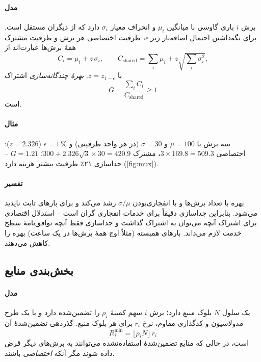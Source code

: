 \documentclass[11pt,a4paper]{article}
\begin{document}
\paragraph{مدل} برش $i$ باری گاوسی با میانگین $\mu_i$ و انحراف معیار $\sigma_i$ دارد که از دیگران مستقل است. برای نگه‌داشتن احتمال
اضافه‌بار زیر $\epsilon$، ظرفیت اختصاصی هر برش و ظرفیت مشترک همهٔ برش‌ها عبارت‌اند از
\begin{equation}\label{eq:dedicated}
  C_i = \mu_i + z\,\sigma_i, \qquad
  C_{\mathrm{shared}} = \sum_i \mu_i + z\sqrt{\sum_i \sigma_i^2},
\end{equation}
با $z = z_{1-\epsilon}$. \emph{بهرهٔ چندگانه‌سازی} اشتراک
\begin{equation}\label{eq:gain}
  G = \frac{\sum_i C_i}{C_{\mathrm{shared}}} \ge 1
\end{equation}
است.
\paragraph{مثال} سه برش با $\mu = 100$ و $\sigma = 30$ (در هر واحد ظرفیتی) و $\epsilon = 1\,\%$ ($z = 2.326$): اختصاصی $3\times169.8 = 509.3$،
مشترک $300 + 2.326\sqrt3\times30 = 420.9$؛ $G = 1.21$ -- جداسازی ۲۱٪ ظرفیت بیشتر هزینه دارد (\cref{fig:mux}).
\paragraph{تفسیر} بهره با تعداد برش‌ها و با انفجاری‌بودن $\sigma/\mu$ رشد می‌کند و برای بارهای ثابت ناپدید می‌شود. بنابراین جداسازی
دقیقاً برای خدمات انفجاری گران است -- استدلال اقتصادی برای اشتراک آنچه می‌توان به اشتراک گذاشت و جداسازی فقط آنچه توافق‌نامهٔ سطح
خدمت لازم می‌داند. بارهای همبسته (مثلاً اوج همهٔ برش‌ها در یک ساعت) بهره را کاهش می‌دهند.

\begin{acnfigure}
  \caption{بهرهٔ چندگانه‌سازی یک مخزن مشترک در برابر ظرفیت اختصاصی برش‌ها (\cref{eq:gain}، $\epsilon = 1\,\%$).}
  \label{fig:mux}
\end{acnfigure}

\subsection{بخش‌بندی منابع }\label{sec:prb}
\paragraph{مدل} یک سلول $N$ بلوک منبع دارد؛ برش $i$ سهم کمینهٔ $\rho_i$ را تضمین‌شده دارد و با یک طرح مدولاسیون و کدگذاری مقاوم، نرخ
$r_i$ برای هر بلوک منبع. گذردهی تضمین‌شدهٔ آن
\begin{equation}\label{eq:prb}
  R_i^{\min} = \lfloor\rho_i N\rfloor\, r_i
\end{equation}
است، در حالی که منابع تضمین‌شدهٔ استفاده‌نشده می‌توانند به برش‌های دیگر قرض داده شوند مگر آنکه \emph{اختصاصی} باشند.
\end{document}
